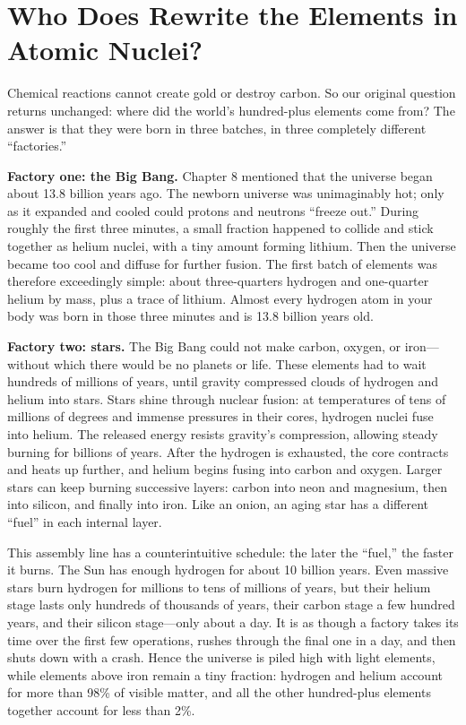 \section{Who Does Rewrite the Elements in Atomic Nuclei?}

Chemical reactions cannot create gold or destroy carbon. So our original question returns unchanged: where did the world's hundred-plus elements come from? The answer is that they were born in three batches, in three completely different ``factories.''

\textbf{Factory one: the Big Bang.} Chapter 8 mentioned that the universe began about 13.8 billion years ago. The newborn universe was unimaginably hot; only as it expanded and cooled could protons and neutrons ``freeze out.'' During roughly the first three minutes, a small fraction happened to collide and stick together as helium nuclei, with a tiny amount forming lithium. Then the universe became too cool and diffuse for further fusion. The first batch of elements was therefore exceedingly simple: about three-quarters hydrogen and one-quarter helium by mass, plus a trace of lithium. Almost every hydrogen atom in your body was born in those three minutes and is 13.8 billion years old.

\textbf{Factory two: stars.} The Big Bang could not make carbon, oxygen, or iron---without which there would be no planets or life. These elements had to wait hundreds of millions of years, until gravity compressed clouds of hydrogen and helium into stars. Stars shine through nuclear fusion: at temperatures of tens of millions of degrees and immense pressures in their cores, hydrogen nuclei fuse into helium. The released energy resists gravity's compression, allowing steady burning for billions of years. After the hydrogen is exhausted, the core contracts and heats up further, and helium begins fusing into carbon and oxygen. Larger stars can keep burning successive layers: carbon into neon and magnesium, then into silicon, and finally into iron. Like an onion, an aging star has a different ``fuel'' in each internal layer.

This assembly line has a counterintuitive schedule: the later the ``fuel,'' the faster it burns. The Sun has enough hydrogen for about 10 billion years. Even massive stars burn hydrogen for millions to tens of millions of years, but their helium stage lasts only hundreds of thousands of years, their carbon stage a few hundred years, and their silicon stage---only about a day. It is as though a factory takes its time over the first few operations, rushes through the final one in a day, and then shuts down with a crash. Hence the universe is piled high with light elements, while elements above iron remain a tiny fraction: hydrogen and helium account for more than 98\% of visible matter, and all the other hundred-plus elements together account for less than 2\%.

